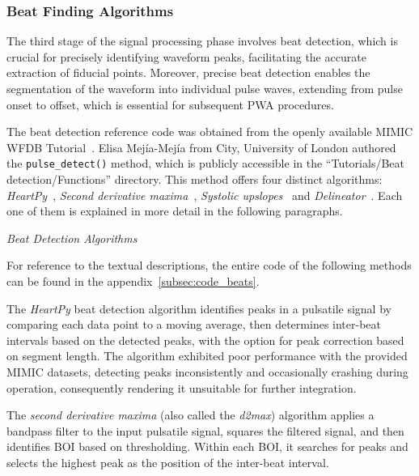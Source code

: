 \subsubsection{Beat Finding Algorithms}
\label{subsubsec:beats}

The third stage of the signal processing phase involves beat detection, which is crucial for precisely identifying waveform peaks, facilitating the accurate extraction of fiducial points.
Moreover, precise beat detection enables the segmentation of the waveform into individual pulse waves, extending from pulse onset to offset, which is essential for subsequent PWA procedures.

The beat detection reference code was obtained from the openly available MIMIC WFDB Tutorial~\cite{charltonMIMICWFDBTutorials2022}.
Elisa Mejía-Mejía from City, University of London authored the \texttt{pulse\_detect()} method, which is publicly accessible in the \enquote{Tutorials/Beat detection/Functions} directory.
This method offers four distinct algorithms: \textit{HeartPy}~\cite{vangentHeartPyNovelHeart2019}, \textit{Second derivative maxima}~\cite{elgendiSystolicPeakDetection2013},
\textit{Systolic upslopes}~\cite{arguellopradaNovelLowcomplexityPeak2018} and \textit{Delineator}~\cite{aboyAutomaticBeatDetection2005}.
Each one of them is explained in more detail in the following paragraphs.

\vspace{0.2cm}
\textit{Beat Detection Algorithms}
\vspace{0.2cm}

For reference to the textual descriptions, the entire code of the following methods can be found in the appendix~\ref{subsec:code_beats}.

The \textit{HeartPy} beat detection algorithm identifies peaks in a pulsatile signal by comparing each data point to a moving average,
then determines inter-beat intervals based on the detected peaks, with the option for peak correction based on segment length.
The algorithm exhibited poor performance with the provided MIMIC datasets, detecting peaks inconsistently and occasionally crashing during operation,
consequently rendering it unsuitable for further integration.

The \textit{second derivative maxima} (also called the \textit{d2max}) algorithm applies a bandpass filter to the input pulsatile signal,
squares the filtered signal, and then identifies \ac{BOI} based on thresholding.
Within each BOI, it searches for peaks and selects the highest peak as the position of the inter-beat interval.

